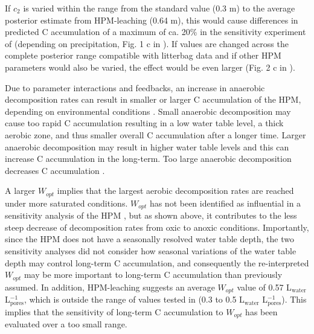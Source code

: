 \documentclass[esd, manuscript]{copernicus}
\begin{document}
If \(c_2\) is varied within the range from the standard value (0.3 m) to the average posterior estimate from HPM-leaching (0.64 m), this would cause differences in predicted C accumulation of a maximum of ca. 20\% in the sensitivity experiment of \citet{Quillet.2013} (depending on precipitation, Fig. 1 c in \citet{Quillet.2013}). If values are changed across the complete posterior range compatible with litterbag data and if other HPM parameters would also be varied, the effect would be even larger (Fig. 2 c in \citet{Quillet.2013}).

Due to parameter interactions and feedbacks, an increase in anaerobic decomposition rates can result in smaller or larger C accumulation of the HPM, depending on environmental conditions \citep{Quillet.2013}. Small anaerobic decomposition may cause too rapid C accumulation resulting in a low water table level, a thick aerobic zone, and thus smaller overall C accumulation after a longer time. Larger anaerobic decomposition may result in higher water table levels and this can increase C accumulation in the long-term. Too large anaerobic decomposition decreases C accumulation \citep{Quillet.2013}.

A larger \(W_{opt}\) implies that the largest aerobic decomposition rates are reached under more saturated conditions. \(W_{opt}\) has not been identified as influential in a sensitivity analysis of the HPM \citep{Quillet.2013}, but as shown above, it contributes to the less steep decrease of decomposition rates from oxic to anoxic conditions. Importantly, since the HPM does not have a seasonally resolved water table depth, the two sensitivity analyses did not consider how seasonal variations of the water table depth may control long-term C accumulation, and consequently the re-interpreted \(W_{opt}\) may be more important to long-term C accumulation than previously assumed. In addition, HPM-leaching suggests an average \(W_{opt}\) value of 0.57 L\(_\text{water}\) L\(_\text{pores}^{-1}\), which is outside the range of values tested in \citet{Quillet.2013} (0.3 to 0.5 L\(_\text{water}\) L\(_\text{pores}^{-1}\)). This implies that the sensitivity of long-term C accumulation to \(W_{opt}\) has been evaluated over a too small range.
\end{document}
